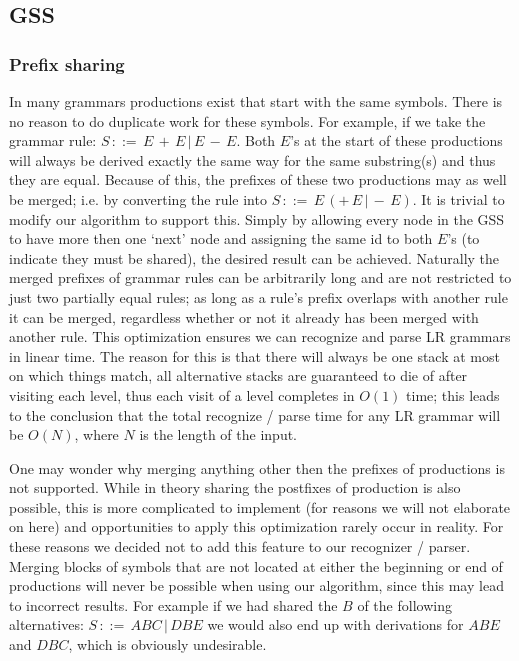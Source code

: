 \documentclass[a4paper,10pt]{article}
\begin{document}
\subsection{GSS}

\subsubsection{Prefix sharing}
\label{sec:prefixSharing}
In many grammars productions exist that start with the same symbols. There is no reason to do duplicate work for these symbols. For example, if we take the grammar rule: $S\,::=\,E\,+\,E\,|\,E\,-\,E$. Both $E$'s at the start of these productions will always be derived exactly the same way for the same substring(s) and thus they are equal. Because of this, the prefixes of these two productions may as well be merged; i.e. by converting the rule into $S\,::=\,E\,(+\,E\,|\,-\,E)$. It is trivial to modify our algorithm to support this. Simply by allowing every node in the GSS to have more then one `next' node and assigning the same id to both $E$'s (to indicate they must be shared), the desired result can be achieved. Naturally the merged prefixes of grammar rules can be arbitrarily long and are not restricted to just two partially equal rules; as long as a rule's prefix overlaps with another rule it can be merged, regardless whether or not it already has been merged with another rule. This optimization ensures we can recognize and parse LR grammars in linear time. The reason for this is that there will always be one stack at most on which things match, all alternative stacks are guaranteed to die of after visiting each level, thus each visit of a level completes in $O(1)$ time; this leads to the conclusion that the total recognize / parse time for any LR grammar will be $O(N)$, where $N$ is the length of the input.

One may wonder why merging anything other then the prefixes of productions is not supported. While in theory sharing the postfixes of production is also possible, this is more complicated to implement (for reasons we will not elaborate on here) and opportunities to apply this optimization rarely occur in reality. For these reasons we decided not to add this feature to our recognizer / parser. Merging blocks of symbols that are not located at either the beginning or end of productions will never be possible when using our algorithm, since this may lead to incorrect results. For example if we had shared the $B$ of the following alternatives: $S\,::=\,ABC\,|\,DBE$ we would also end up with derivations for $ABE$ and $DBC$, which is obviously undesirable.
\end{document}
